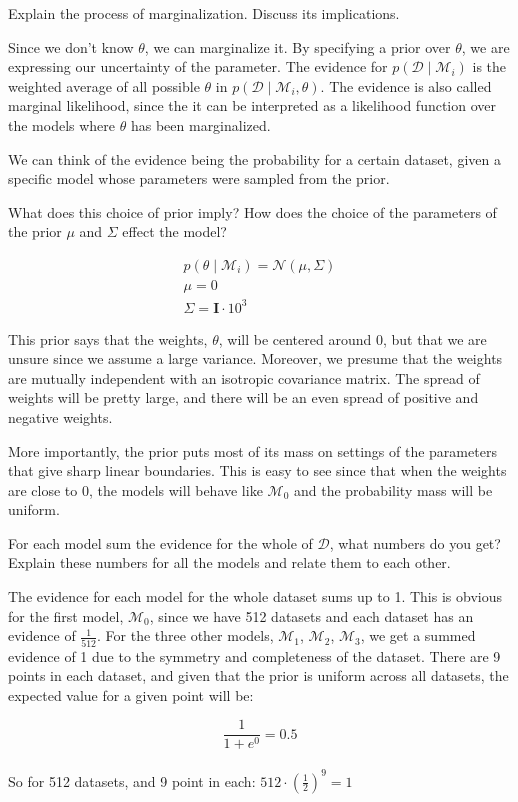 \documentclass[12pt]{article}
\newenvironment{question}[2][Question]{\begin{trivlist}
\kern10pt
\item[\hskip \labelsep {\bfseries #1}\hskip \labelsep {\bfseries #2.}]}{\end{trivlist}}
\newcommand*{\answer}{%
  \par
  \kern1pt
  \begingroup
    \centering
    \raisebox{.2\baselineskip}{%
      \textcolor{gray}{
	    \rule{.6667\linewidth}{.1pt}%
      }
    }%
    \par
  \kern8pt
  \endgroup
}
\begin{document}
\begin{question}{24}
Explain the process of marginalization. Discuss its implications.

\answer

Since we don't know $\theta$, we can marginalize it. By specifying a prior over $\theta$, we are expressing our uncertainty of the parameter. The evidence for $p(\mathcal{D} \mid \mathcal{M}_i)$ is the weighted average of all possible $\theta$ in $p(\mathcal{D} \mid \mathcal{M}_i, \theta)$. The evidence is also called marginal likelihood, since the it can be interpreted as a likelihood function over the models where $\theta$ has been marginalized.

We can think of the evidence being the probability for a certain dataset, given a specific model whose parameters were sampled from the prior.
\end{question}

\begin{question}{25}
What does this choice of prior imply? How does the choice of the parameters of the prior $\mu$ and $\Sigma$ effect the model?

\answer

\begin{gather*}
p(\theta \mid \mathcal{M}_i) = \mathcal{N} (\mu, \Sigma)
\\
\mu = 0
\\
\Sigma = \boldsymbol{I} \cdot 10^3
\end{gather*}

This prior says that the weights, $\theta$, will be centered around 0, but that we are unsure since we assume a large variance. Moreover, we presume that the weights are mutually independent with an isotropic covariance matrix. The spread of weights will be pretty large, and there will be an even spread of positive and negative weights.

More importantly, the prior puts most of its mass on settings of the parameters that give sharp linear boundaries. This is easy to see since that when the weights are close to 0, the models will behave like $\mathcal{M}_0$ and the probability mass will be uniform.
\end{question}

\begin{question}{26}
For each model sum the evidence for the whole of $\mathcal{D}$, what numbers do you get?
Explain these numbers for all the models and relate them to each other.

\answer

The evidence for each model for the whole dataset sums up to 1. This is obvious for the first model, $\mathcal{M}_0$, since we have 512 datasets and each dataset has an evidence of $\frac{1}{512}$. 
For the three other models, $\mathcal{M}_1$, $\mathcal{M}_2$, $\mathcal{M}_3$, we get a summed evidence of 1 due to the symmetry and completeness of the dataset. There are 9 points in each dataset, and given that the prior is uniform across all datasets, the expected value for a given point will be:

$$\frac{1}{1 + e^0} = 0.5$$
\\
So for 512 datasets, and 9 point in each: $512 \cdot (\frac{1}{2})^9 = 1$
\end{question}
\end{document}
